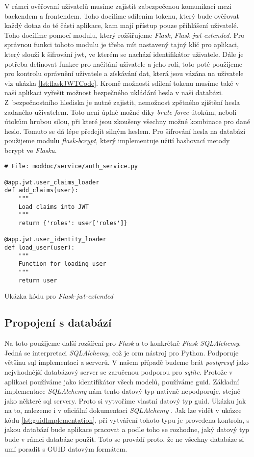 V rámci ověřovaní uživatelů musíme zajistit zabezpečenou komunikaci mezi backendem a frontendem. Toho docílíme sdílením tokenu, který bude ověřovat
každý dotaz do té části aplikace, kam mají přístup pouze přihlášení uživatelé. Toho docílíme pomocí modulu, který rožšiřujeme \textit{Flask},
\textit{Flask-jwt-extended}. Pro správnou funkci tohoto modulu je třeba mít nastavený tajný klíč pro aplikaci, který slouží k šifrování \gls{jwt},
ve kterém se nachází identifikátor uživatele. Dále je potřeba definovat funkce pro načítání uživatele a jeho rolí, toto poté použijeme pro kontrolu
oprávnění uživatele a získávání dat, která jsou vázána na uživatele viz ukázka \ref{lst:flaskJWTCode}. Kromě možnosti sdílení tokenu musíme
také v naší aplikaci vyřešit možnost bezpečného ukládání hesla v naší databázi. Z~bezpečnostního hlediska je nutné zajistit, nemožnost zpětného
zjištění hesla zadaného uživatelem. Toto není úplně možné díky \textit{brute force} útokům, neboli útokům hrubou silou, při které jsou zkoušeny
všechny možné kombinace pro dané heslo. Tomuto se dá lépe předejít silným heslem. Pro šifrování hesla na databázi použijeme modulu \textit{flask-bcrypt},
který implementuje užití hashovací metody bcrypt ve \textit{Flasku}.

\begin{listing}[H]
    \begin{verbatim}
# File: moddoc/service/auth_service.py

@app.jwt.user_claims_loader
def add_claims(user):
    """
    Load claims into JWT
    """
    return {'roles': user['roles']}

@app.jwt.user_identity_loader
def load_user(user):
    """
    Function for loading user
    """
    return user
    \end{verbatim}
    \caption{Ukázka kódu pro \textit{Flask-jwt-extended}}
    \label{lst:flaskJWTCode}
\end{listing}

\subsection{Propojení s databází}

Na toto použijeme další rozšíření pro \textit{Flask} a to konkrétně \textit{Flask-SQLAlchemy}. Jedná se interpretaci \textit{SQLAlchemy}, což je \gls{orm} nástroj pro Python.
Podporuje většinu \gls{sql} implementací a serverů. V našem případě budeme brát \textit{postgresql} jako nejvhodnější databázový server se zaručenou podporou pro \textit{sqlite}. Protože
v aplikaci používáme jako identifikátor všech modelů, používáme \gls{guid}. Základní implementace \textit{SQLAlchemy} nám tento datový typ nativně nepodporuje, stejně jako
některé \gls{sql} servery. Proto si vytvoříme vlastní datový typ \gls{guid}. Ukázku jak na to, nalezeme i v oficiální dokumentaci \textit{SQLAlchemy} \cite{sqlalchemyGuid}. Jak lze
vidět v ukázce kódu \ref{lst:guidImplementation}, při vytváření tohoto typu je provedena kontrola, s jakou databází bude aplikace pracovat a podle toho se rozhodne, jaký datový typ
bude v rámci databáze použit. Toto se provádí proto, že ne všechny databáze si umí poradit s GUID datovým formátem.

